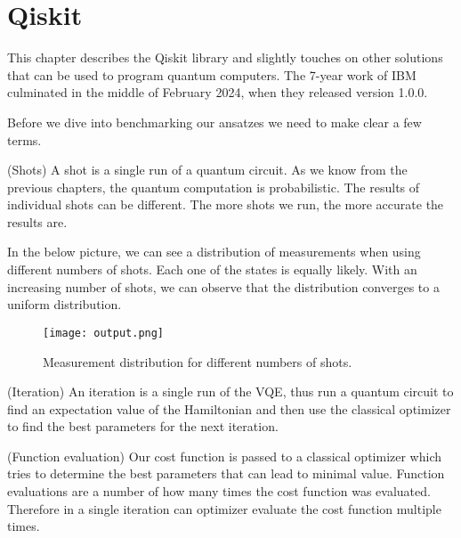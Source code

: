 \chapter{Qiskit}\label{ch:qiskit}
This chapter describes the Qiskit library and slightly touches on other solutions that can be used to program quantum computers.
The 7-year work of IBM culminated in the middle of February 2024, when they released version 1.0.0.

Before we dive into benchmarking our ansatzes we need to make clear a few terms.
\begin{definition} (Shots) 
    A shot is a single run of a quantum circuit. As we know from the previous chapters, the quantum computation is probabilistic. The results of individual shots can be different. The more shots we run, the more accurate the results are.
\end{definition}

In the below picture, we can see a distribution of measurements when using different numbers of shots. Each one of the states is equally likely. With an increasing number of shots, we can observe that the distribution converges to a uniform distribution.

\begin{figure}[htb!]
    \centering
    \texttt{[image: output.png]}
    \caption{Measurement distribution for different numbers of shots.}\label{fig:output}
\end{figure}

\begin{definition} (Iteration) 
    An iteration is a single run of the VQE, thus run a quantum circuit to find an expectation value of the Hamiltonian and then use the classical optimizer to find the best parameters for the next iteration.
\end{definition}

\begin{definition}(Function evaluation)
    Our cost function is passed to a classical optimizer which tries to determine the best parameters that can lead to minimal value. Function evaluations are a number of how many times the cost function was evaluated. Therefore in a single iteration can optimizer evaluate the cost function multiple times.
\end{definition}

